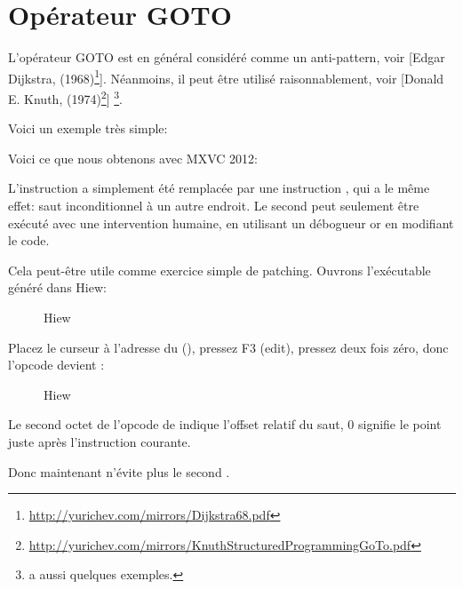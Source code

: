 \section{Opérateur GOTO}

L'opérateur GOTO est en général considéré comme un anti-pattern, voir
[Edgar Dijkstra,  (1968)\footnote{\url{http://yurichev.com/mirrors/Dijkstra68.pdf}}].
Néanmoins, il peut être utilisé raisonnablement, voir
[Donald E. Knuth,  (1974)\footnote{\url{http://yurichev.com/mirrors/KnuthStructuredProgrammingGoTo.pdf}}]
\footnote{\InSqBrackets{\CNotes} a aussi quelques exemples.}.

Voici un exemple très simple:



Voici ce que nous obtenons avec MXVC 2012:



L'instruction  a simplement été remplacée par une instruction \JMP, qui
a le même effet: saut inconditionnel à un autre endroit.
Le second \printf peut seulement être exécuté avec une intervention humaine, en
utilisant un débogueur or en modifiant le code.

\par

\clearpage

Cela peut-être utile comme exercice simple de patching. Ouvrons l'exécutable généré
dans Hiew:

\begin{figure}[H]
\centering
{}
\caption{Hiew}
\label{fig:goto_hiew1}
\end{figure}

\clearpage
Placez le curseur à l'adresse du \JMP (),
pressez F3 (edit), pressez deux fois zéro, donc l'opcode devient :

\begin{figure}[H]
\centering
{}
\caption{Hiew}
\label{fig:goto_hiew2}
\end{figure}

Le second octet de l'opcode de \JMP indique l'offset relatif du saut, 0 signifie
le point juste après l'instruction courante.

Donc maintenant \JMP n'évite plus le second \printf.


